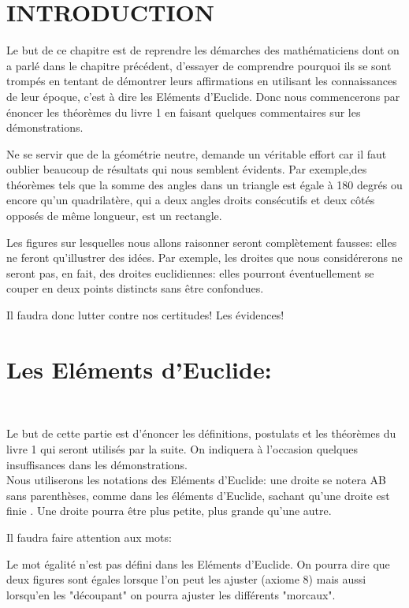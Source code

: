\documentclass[a4paper, 12pt, twoside]{book}
\begin{document}
\chapter{INTRODUCTION}




Le but de ce chapitre est de reprendre les démarches des mathématiciens dont on a parlé dans le chapitre précédent, d'essayer de comprendre pourquoi ils se sont trompés en tentant de démontrer leurs affirmations en utilisant les connaissances de leur époque, c'est à dire les Eléments d'Euclide. Donc nous commencerons par énoncer les théorèmes du livre 1 en faisant quelques commentaires sur les démonstrations.\ 

Ne se servir que de la géométrie neutre, demande un véritable effort car il faut oublier beaucoup de résultats qui nous semblent évidents. Par exemple,des théorèmes tels que la somme des angles dans un triangle est égale à 180 degrés ou encore  qu'un quadrilatère, qui a deux angles droits  consécutifs et deux côtés opposés de même longueur, est un rectangle.\

Les figures sur lesquelles nous allons raisonner seront complètement fausses: elles ne feront qu'illustrer des idées. Par exemple, les droites que nous considérerons ne seront pas, en fait, des droites euclidiennes: elles pourront éventuellement se couper en deux points distincts sans être confondues.\

Il faudra donc lutter contre nos certitudes! Les évidences!

\chapter{ Les Eléments d'Euclide:}\


Le but de cette partie est d'énoncer les définitions, postulats et les théorèmes du livre 1 qui seront utilisés par la suite. On indiquera à l'occasion quelques insuffisances dans les démonstrations.\\


Nous utiliserons les notations des Eléments d'Euclide: une droite se notera AB sans parenthèses, comme dans les éléments d'Euclide, sachant qu'une droite est finie . Une droite pourra être plus petite, plus grande qu'une autre.\

Il faudra faire attention aux mots:\


Le mot égalité n'est pas défini dans les Eléments d'Euclide. On pourra dire que deux figures sont égales lorsque l'on peut les ajuster (axiome 8) mais aussi lorsqu'en les "découpant" on pourra ajuster les différents "morcaux".\
\end{document}
